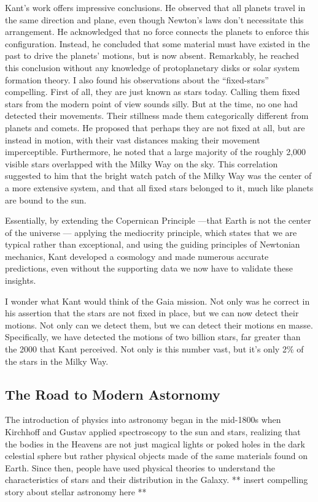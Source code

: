 Kant's work offers impressive conclusions. He observed that all planets travel in the same direction and plane, even though Newton's laws don't necessitate this arrangement. He acknowledged that no force connects the planets to enforce this configuration. Instead, he concluded that some material must have existed in the past to drive the planets' motions, but is now absent. Remarkably, he reached this conclusion without any knowledge of protoplanetary disks or solar system formation theory. I also found his observations about the “fixed-stars” compelling. First of all, they are just known as stars today. Calling them fixed stars from the modern point of view sounds silly. But at the time, no one had detected their movements. Their stillness made them categorically different from planets and comets. He proposed that perhaps they are not fixed at all, but are instead in motion, with their vast distances making their movement imperceptible. Furthermore, he noted that a large majority of the roughly 2,000 visible stars overlapped with the Milky Way on the sky. This correlation suggested to him that the bright watch patch of the Milky Way was the center of a more extensive system, and that all fixed stars belonged to it, much like planets are bound to the sun.

Essentially, by extending the Copernican Principle —that Earth is not the center of the universe — applying the mediocrity principle, which states that we are typical rather than exceptional, and using the guiding principles of Newtonian mechanics, Kant developed a cosmology and made numerous accurate predictions, even without the supporting data we now have to validate these insights. 

I wonder what Kant would think of the Gaia mission. Not only was he correct in his assertion that the stars are not fixed in place, but we can now detect their motions. Not only can we detect them, but we can detect their motions en masse. Specifically, we have detected the motions of two billion stars, far greater than the 2000 that Kant perceived. Not only is this number vast, but it's only 2\% of the stars in the Milky Way. 

\subsection{The Road to Modern Astornomy}
The introduction of physics into astronomy began in the mid-1800s when Kirchhoff and Gustav applied spectroscopy to the sun and stars, realizing that the bodies in the Heavens are not just magical lights or poked holes in the dark celestial sphere but rather physical objects made of the same materials found on Earth. Since then, people have used physical theories to understand the characteristics of stars and their distribution in the Galaxy. ** insert compelling story about stellar astronomy here ** 

